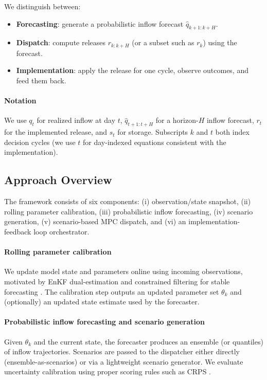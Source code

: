 \documentclass[conference]{IEEEtran}
\begin{document}
We distinguish between:
\begin{itemize}[leftmargin=*]
\item \textbf{Forecasting}: generate a probabilistic inflow forecast $\hat{q}_{k+1:k+H}$.
\item \textbf{Dispatch}: compute releases $r_{k:k+H}$ (or a subset such as $r_k$) using the forecast.
\item \textbf{Implementation}: apply the release for one cycle, observe outcomes, and feed them back.
\end{itemize}

\paragraph{Notation}
We use $q_t$ for realized inflow at day $t$, $\hat{q}_{t+1:t+H}$ for a horizon-$H$ inflow
forecast, $r_t$ for the implemented release, and $s_t$ for storage. Subscripts $k$ and $t$
both index decision cycles (we use $t$ for day-indexed equations consistent with the
implementation).

\subsection{Approach Overview}
The framework consists of six components:
(i) observation/state snapshot, (ii) rolling parameter calibration, (iii) probabilistic inflow
forecasting, (iv) scenario generation, (v) scenario-based MPC dispatch, and (vi) an
implementation-feedback loop orchestrator.

\paragraph{Rolling parameter calibration}
We update model state and parameters online using incoming observations, motivated by EnKF
dual-estimation and constrained filtering for stable forecasting
\cite{moradkhani2005dual,evensen2003ensemble,maxwell2018constraining,xiong2019identifying}.
The calibration step outputs an updated parameter set $\theta_k$ and (optionally) an updated
state estimate used by the forecaster.

\paragraph{Probabilistic inflow forecasting and scenario generation}
Given $\theta_k$ and the current state, the forecaster produces an ensemble (or quantiles) of
inflow trajectories. Scenarios are passed to the dispatcher either directly (ensemble-as-scenarios)
or via a lightweight scenario generator. We evaluate uncertainty calibration using proper
scoring rules such as CRPS \cite{gneiting2007strictly}.
\end{document}
